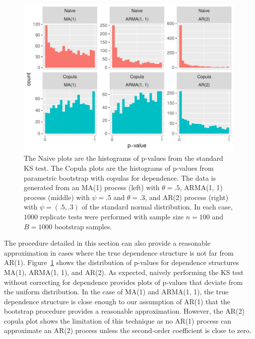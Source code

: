 \documentclass[12pt, letterpaper, titlepage]{article}
\begin{document}
\begin{figure}[tbp]
  \centering
  \includegraphics[width=\textwidth]{hist_ma1_arma_ar2_D}
  \caption{The Naive plots are the histograms of p-values from the standard KS
  test. The Copula plots are the histograms of p-values from parametric
  bootstrap with copulas for dependence. The data is generated from an MA(1)
  process (left) with $\theta = .5$, ARMA(1, 1) process (middle) with $\psi =
  .5$ and $\theta = .3$, and AR(2) process (right) with $\psi = (.5, .3)$ of the
  standard normal distribution. In each case, $1000$ replicate tests were
  performed with sample size $n = 100$ and $B = 1000$ bootstrap samples.}
  \label{fig:hist_ma1_arma_ar2_D}
\end{figure}

The procedure detailed in this section can also provide a reasonable
approximation in cases where the true dependence structure is not far from
AR(1). Figure~\ref{fig:hist_ma1_arma_ar2_D} shows the distribution of p-values
for dependence structures MA(1), ARMA(1, 1), and AR(2). As expected,
naively performing the KS test without correcting for dependence provides plots
of p-values that deviate from the uniform distribution. In the case of MA(1)
and ARMA(1, 1), the true dependence structure is close enough to our
assumption of AR(1) that the bootstrap procedure provides a reasonable
approximation. However, the AR(2) copula plot shows the limitation of this
technique as no AR(1) process can approximate an AR(2) process unless the
second-order coefficient is close to zero.
\end{document}
